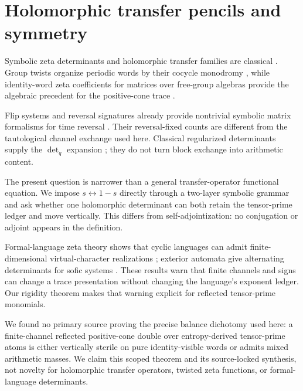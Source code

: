 \section{Holomorphic transfer pencils and symmetry}
\label{sec:related}

Symbolic zeta determinants and holomorphic transfer families are classical
\citep{bowenlanford1970,ruelle1976}.  Group twists organize periodic words by
their cocycle monodromy \citep{parrypollicott1990}, while identity-word zeta
coefficients for matrices over free-group algebras provide the algebraic
precedent for the positive-cone trace \citep{kasselreutenauer2014}.

Flip systems and reversal signatures already provide nontrivial symbolic
matrix formalisms for time reversal \citep{kimleepark2003,ryu2023}.  Their
reversal-fixed counts are different from the tautological channel exchange
used here.  Classical regularized determinants supply the $\det_q$ expansion
\citep{simon1977}; they do not turn block exchange into arithmetic content.

The present question is narrower than a general transfer-operator functional
equation.  We impose $s\leftrightarrow1-s$ directly through a two-layer
symbolic grammar and ask whether one holomorphic determinant can both retain
the tensor-prime ledger and move vertically.  This differs from
self-adjointization: no conjugation or adjoint appears in the definition.

Formal-language zeta theory shows that cyclic languages can admit
finite-dimensional virtual-character realizations
\citep{berstelreutenauer1990}; exterior automata give alternating
determinants for sofic systems \citep{beal1995}.  These results warn that
finite channels and signs can change a trace presentation without changing
the language's exponent ledger.  Our rigidity theorem makes that warning
explicit for reflected tensor-prime monomials.

We found no primary source proving the precise balance dichotomy used here:
a finite-channel reflected positive-cone double over entropy-derived
tensor-prime atoms is either vertically sterile on pure identity-visible
words or admits mixed arithmetic masses.  We claim this scoped theorem and
its source-locked synthesis, not novelty for holomorphic transfer operators,
twisted zeta functions, or formal-language determinants.
